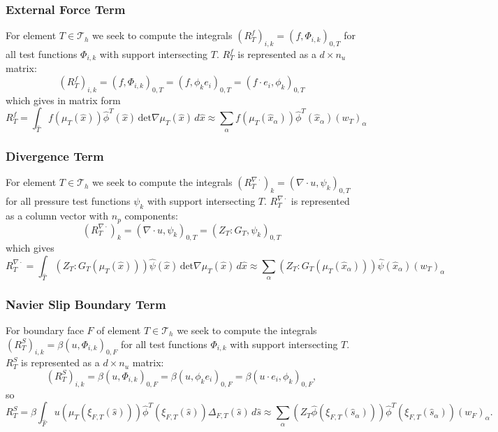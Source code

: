 \documentclass[a4paper,
		     12pt,
		     DIV10,
		     DIVcalc,
		     headings=normal,
		     oneside,
		     bibliography=totoc,
		     headsepline=false,
		     headinclude]{scrartcl}
\theoremstyle{definition}
\begin{document}
\subsubsection*{External Force Term}

For element $T\in\mathcal{T}_h$ we seek to compute the integrals 
$(R^{f}_T)_{i,k} = ( f, \Phi_{i,k})_{0,T}$ for all test functions $\Phi_{i,k}$
with support intersecting $T$. $R^f_T$ is represented as a $d\times n_u$ matrix:
\begin{equation*}
(R^{f}_T)_{i,k} = \left( f,\Phi_{i,k}\right)_{0,T} =  \left( f,\phi_{k} e_i\right)_{0,T} =  \left( f\cdot e_i,\phi_{k}\right)_{0,T}
\end{equation*}
which gives in matrix form
\begin{equation}
R^{f}_T = \int_{\hat T} f(\mu_T(\hat x)) \hat\phi^T(\hat x)  \, \text{det} \nabla\mu_T(\hat x) \,d\hat x
\approx \sum_\alpha f(\mu_T(\hat x_\alpha)) \hat\phi^T(\hat x_\alpha) (w_T)_\alpha
\end{equation}

\subsubsection*{Divergence Term}

For element $T\in\mathcal{T}_h$ we seek to compute the integrals 
$(R^{\nabla\cdot}_T)_{k} = ( \nabla\cdot u, \psi_{k})_{0,T}$ for all pressure test functions $\psi_{k}$
with support intersecting $T$. $R^{\nabla\cdot}_T$ is represented as a column vector with $n_p$ components:
\begin{equation*}
(R^{\nabla\cdot}_T)_{k} = \left( \nabla\cdot u,\psi_{k}\right)_{0,T} 
= \left( Z_T:G_T,\psi_{k}\right)_{0,T} 
\end{equation*}
which gives 
\begin{equation*}
R^{\nabla\cdot}_T = \int_{\hat T} (Z_T : G_T(\mu_T(\hat x))) \hat\psi(\hat x) \, \text{det} \nabla\mu_T(\hat x) \,d\hat x
\approx \sum_\alpha  (Z_T : G_T(\mu_T(\hat x_\alpha))) \hat\psi(\hat x_\alpha) (w_T)_\alpha
\end{equation*}

\subsubsection*{Navier Slip Boundary Term}

For boundary face $F$ of element $T\in\mathcal{T}_h$ we seek to compute the integrals 
$(R^{S}_T)_{i,k} = \beta ( u , \Phi_{i,k})_{0,F}$ for all test functions $\Phi_{i,k}$
with support intersecting $T$. $R^{S}_T$ is represented as a $d\times n_u$ matrix:
\begin{equation*}
(R^{S}_T)_{i,k} = \beta ( u , \Phi_{i,k})_{0,F} = \beta ( u , \phi_{k}e_i )_{0,F} = \beta ( u\cdot e_i , \phi_{k} )_{0,F} ,
\end{equation*}
so
\begin{equation}
R^{S}_T = \beta \int_{\hat F} u(\mu_T(\xi_{F,T}(\hat s)))  \hat\phi^T(\xi_{F,T}(\hat s)) \Delta_{F,T}(\hat s) \,d\hat s
\approx \sum_\alpha (Z_T \hat\phi(\xi_{F,T}(\hat s_\alpha))) \hat\phi^T(\xi_{F,T}(\hat s_\alpha))  (w_F)_\alpha .
\end{equation}
\end{document}
